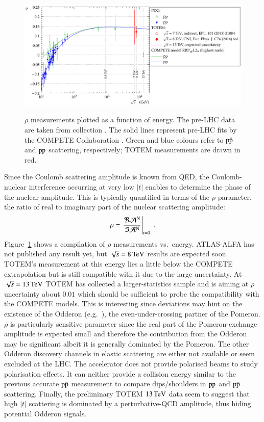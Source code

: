 \documentclass{webofc}
\def\un#1{\,{\rm #1}}
\begin{document}
\begin{figure}[h]
\centering
\includegraphics[height=6cm,clip]{fig/es_rho_vs_s.pdf}
\vskip-4mm
\caption{$\rho$ measurements plotted as a function of energy. The pre-LHC data are taken from collection \cite{pdg}. The solid lines represent pre-LHC fits by the COMPETE Collaboration \cite{compete}. Green and blue colours refer to $\rm p\bar p$ and $\rm pp$ scattering, respectively; TOTEM measurements are drawn in red.}
\label{f:es rho}
\end{figure}

Since the Coulomb scattering amplitude is known from QED, the Coulomb-nuclear interference occurring at very low $|t|$ enables to determine the phase of the nuclear amplitude. This is typically quantified in terms of the $\rho$ parameter, the ratio of real to imaginary part of the nuclear scattering amplitude:
\begin{equation}
\rho = \left. {\Re {\cal A}^{\rm N} \over \Im {\cal A}^{\rm N}} \right|_{t = 0}\ .
\end{equation}
Figure~\ref{f:es rho} shows a compilation of $\rho$ measurements vs.~energy. ATLAS-ALFA has not published any result yet, but $\sqrt s = 8\un{TeV}$ results are expected soon. TOTEM's measurement at this energy \cite{totem-8tev-1km} lies a little below the COMPETE extrapolation \cite{compete} but is still compatible with it due to the large uncertainty. At $\sqrt s = 13\un{TeV}$ TOTEM has collected a larger-statistics sample and is aiming at $\rho$ uncertainty about $0.01$ which should be sufficient to probe the compatibility with the COMPETE models. This is interesting since deviations may hint on the existence of the Odderon (e.g.~\cite{ewertz,nicolescu}), the even-under-crossing partner of the Pomeron. $\rho$ is particularly sensitive parameter since the real part of the Pomeron-exchange amplitude is expected small and therefore the contribution from the Odderon may be significant albeit it is generally dominated by the Pomeron. The other Odderon discovery channels in elastic scattering are either not available or seem excluded at the LHC. The accelerator does not provide polarised beams to study polarisation effects. It can neither provide a collision energy similar to the previous accurate $\rm p\bar p$ measurement to compare dips/shoulders in $\rm pp$ and $\rm p\bar p$ scattering. Finally, the preliminary TOTEM $13\un{TeV}$ data seem to suggest that high $|t|$ scattering is dominated by a perturbative-QCD amplitude, thus hiding potential Odderon signals.
\end{document}
